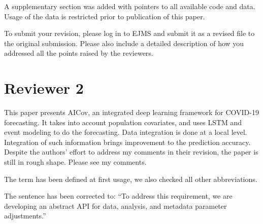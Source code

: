   
  {A supplementary section was added with pointers to all available code and data. Usage of the data is restricted prior to publication of this paper.}


To submit your revision, please log in to EJMS and submit it as a
revised file to the original submission. Please also include a
detailed description of how you addressed all the points raised by the
reviewers.

\section*{Reviewer 2}

This paper presents AICov, an integrated deep learning framework for
COVID-19 forecasting. It takes into account population covariates, and
uses LSTM and event modeling to do the forecasting. Data integration
is done at a local level. Integration of such information brings
improvement to the prediction accuracy. Despite the authors’ effort to
address my comments in their revision, the paper is still in rough
shape. Please see my comments.

\bigskip

  { The term has been defined at first usage, we also checked all
    other abbreviations. }



  {The sentence has been corrected to: ``To address this requirement, we are developing an
  abstract API for data, analysis, and metadata parameter
  adjustments.''}


